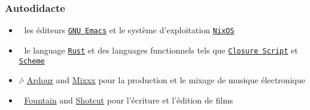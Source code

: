 \documentclass[11pt]{article}
\begin{document}
\subsubsection{Autodidacte}
\label{sec:org8efa4ae}
\begin{itemize}
\item 🐄 les éditeurs \href{https://www.gnu.org/software/emacs/}{\texttt{GNU Emacs}} et le système d'exploitation \href{https://nixos.org/}{\texttt{NixOS}}
\item 🦀 le language \href{https://www.rust-lang.org/}{\texttt{Rust}} et des languages functionnels tels que \href{https://clojurescript.org/}{\texttt{Closure Script}} et \href{http://www.call-cc.org/}{\texttt{Scheme}}
\item 🎶 \href{https://ardour.org/}{Ardour} and \href{https://mixxx.org/}{Mixxx} pour la production et le mixage de musique électronique
\item 🎥 \href{https://fountain.io/}{Fountain} and \href{https://www.shotcut.org/}{Shotcut} pour l'écriture et l'édition de films
\end{itemize}
\end{document}
